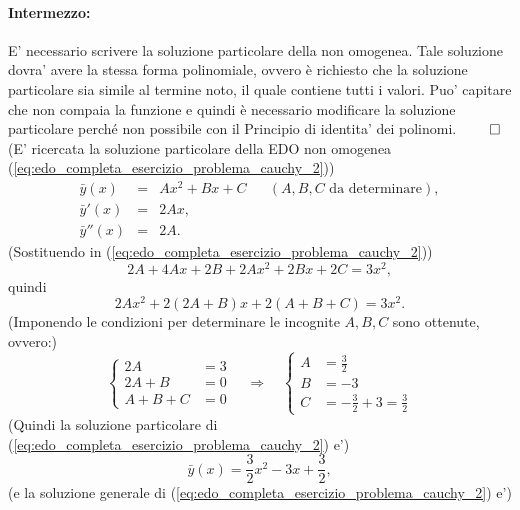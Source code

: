 \begin{example}
	\paragraph{Intermezzo:} E' necessario scrivere la soluzione particolare della non omogenea. Tale soluzione dovra' avere la stessa forma polinomiale, ovvero è richiesto che la soluzione particolare sia simile al termine noto, il quale contiene tutti i valori. Puo' capitare che non compaia la funzione e quindi è necessario modificare la soluzione particolare perché non possibile con il Principio di identita' dei polinomi. $\qed$\\
	(E' ricercata la soluzione particolare della EDO non omogenea (\ref{eq:edo_completa_esercizio_problema_cauchy_2}))
	\begin{equation*}
		\begin{matrix}
			\bar y(x) &=& A x^2 + Bx + C && (A,B,C \text{ da determinare}),\\
			\bar y'(x) &=& 2Ax,\\
			\bar y''(x) &=& 2A.
		\end{matrix}
	\end{equation*}
	(Sostituendo in (\ref{eq:edo_completa_esercizio_problema_cauchy_2}))
	\begin{equation*}
		2A + 4Ax + 2B + 2Ax^2 + 2Bx + 2C = 3x^2,
	\end{equation*}
	quindi
	\begin{equation*}
		2A x^2 + 2(2A+B)x + 2(A+B+C) = 3x^2.
	\end{equation*}
	(Imponendo le condizioni per determinare le incognite $A,B,C$ sono ottenute, ovvero:)
	\begin{equation*}
		\begin{cases}
			2A &= 3\\
			2 A + B &= 0\\
			A + B + C &=0 
		\end{cases}\quad\Longrightarrow\quad
		\begin{cases}
			A &= \frac{3}{2}\\
			B &= -3\\
			C &= -\frac{3}{2} + 3 = \frac{3}{2}
		\end{cases}
	\end{equation*}
	(Quindi la soluzione particolare di (\ref{eq:edo_completa_esercizio_problema_cauchy_2}) e')
	\begin{equation*}
		\bar y(x) = \frac{3}{2}x^2 -3x + \frac{3}{2},
	\end{equation*}
	(e la soluzione generale di (\ref{eq:edo_completa_esercizio_problema_cauchy_2}) e')

\end{example}
